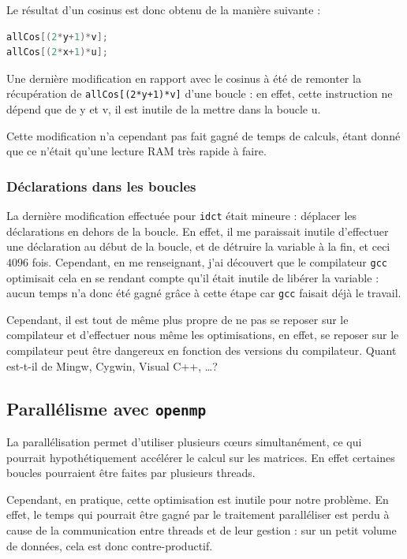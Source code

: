 \documentclass[a4paper, 11pt]{article}
\begin{document}
	Le résultat d'un cosinus est donc obtenu de la manière suivante :
	\begin{lstlisting}[language=C,numbers=none, caption=Obtention du résultat d'un cosinus]
allCos[(2*y+1)*v];
allCos[(2*x+1)*u];
\end{lstlisting}

Une dernière modification en rapport avec le cosinus à été de remonter la récupération de \texttt{allCos[(2*y+1)*v]} d'une boucle : 
en effet, cette instruction ne dépend que de y et v, il est inutile de la mettre dans la boucle u.
\begin{remarque}
	Cette modification n'a cependant pas fait gagné de temps de calculs, étant donné que ce n'était qu'une lecture RAM très rapide à faire.	
\end{remarque}
	\subsubsection{Déclarations dans les boucles}
	La dernière modification effectuée pour \texttt{idct} était mineure : déplacer les déclarations en dehors de la boucle. En effet, il me paraissait inutile
	d'effectuer une déclaration au début de la boucle, et de détruire la variable à la fin, et ceci $4096$ fois. Cependant, en me renseignant, j'ai découvert que
	le compilateur \texttt{gcc} optimisait cela en se rendant compte qu'il était inutile de libérer la variable : aucun temps n'a donc été gagné grâce à cette
	étape car \texttt{gcc} faisait déjà le travail. 

	Cependant, il est tout de même plus propre de ne pas se reposer sur le compilateur et d'effectuer nous même les optimisations, en effet, se reposer sur le
	compilateur peut être dangereux en fonction des versions du compilateur. Quant est-t-il de Mingw, Cygwin, Visual C++, \ldots ?
	\subsection{Parallélisme avec \texttt{openmp}}
	La parallélisation permet d'utiliser plusieurs cœurs simultanément, ce qui pourrait hypothétiquement accélérer le calcul sur les matrices. En effet certaines
	boucles pourraient être faites par plusieurs threads.

	Cependant, en pratique, cette optimisation est inutile pour notre problème. En effet, le temps qui pourrait être gagné par le traitement paralléliser est
	perdu à cause de la communication entre threads et de leur gestion : sur un petit volume de données, cela est donc contre-productif.
\end{document}
